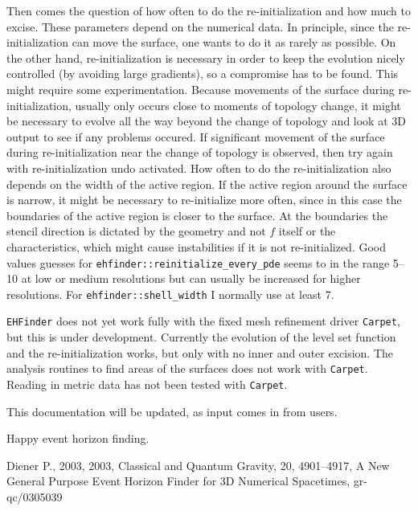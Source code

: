 Then comes the question of how often to do the re-initialization and how
much to excise. These parameters depend on the numerical data. In principle,
since the re-initialization can move the surface, one wants to do it as
rarely as possible. On the other hand, re-initialization is necessary
in order to keep the evolution nicely controlled (by avoiding large gradients),
so a compromise has to be found. This might require some experimentation.
Because movements of the surface during re-initialization, usually only
occurs close to moments of topology change, it might be necessary to evolve
all the way beyond the change of topology and look at 3D output to see if
any problems occured. If significant movement of the surface during
re-initialization near the change of topology is observed, then try again
with re-initialization undo activated. How often to do the re-initialization
also depends on the width of the active region. If the active region around
the surface is narrow, it might be necessary to re-initialize more often,
since in this case the boundaries of the active region is closer to the
surface. At the boundaries the stencil direction is dictated by the geometry
and not $f$ itself or the characteristics, which might cause instabilities
if it is not re-initialized. Good values guesses for
{\tt ehfinder::reinitialize\_every\_pde} seems to in the range 5--10 at
low or medium resolutions but can usually be increased for higher
resolutions. For {\tt ehfinder::shell\_width} I normally use at least 7.

{\tt EHFinder} does not yet work fully with the fixed mesh refinement driver
{\tt Carpet}, but this is under development. Currently the evolution of the
level set function and the re-initialization works, but only with no inner
and outer excision. The analysis routines to find areas of the surfaces does
not work with {\tt Carpet}. Reading in metric data has not been tested with
{\tt Carpet}.

This documentation will be updated, as input comes in from users.

Happy event horizon finding.

\begin{thebibliography}{9}

   {Diener P., 2003, 2003, Classical and Quantum Gravity, 20, 4901--4917,
    A New General Purpose Event Horizon Finder for 3D Numerical Spacetimes,
    gr-qc/0305039}
\end{thebibliography}



